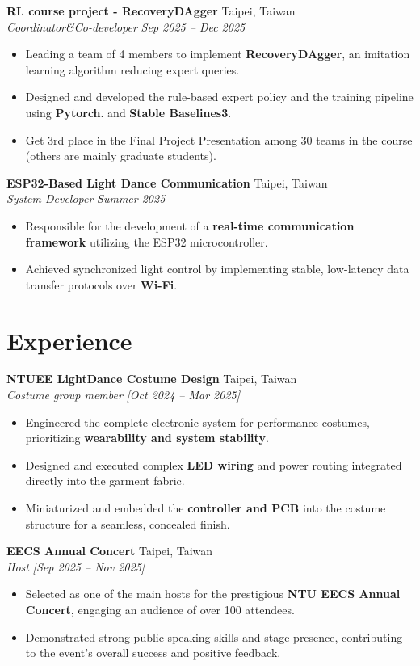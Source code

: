 \documentclass[10pt,a4paper]{article}
\newcommand{\resumeSubheading}[4]{
  \textbf{#1} \hfill #2 \\
  \textit{#3} \hfill \textit{#4}
}
\newcommand{\resumeItem}[1]{
  \item #1
}
\begin{document}
\resumeSubheading{RL course project - RecoveryDAgger}{Taipei, Taiwan}{Coordinator\&Co-developer}{Sep 2025 -- Dec 2025}
\begin{itemize}
  \resumeItem{Leading a team of 4 members to implement \textbf{RecoveryDAgger}, an imitation learning algorithm reducing expert queries.}
  \resumeItem{Designed and developed the rule-based expert policy and the training pipeline using \textbf{Pytorch}. and \textbf{Stable Baselines3}.}
  \resumeItem{Get 3rd place in the Final Project Presentation among 30 teams in the course (others are mainly graduate students).}
\end{itemize}
\resumeSubheading
  {ESP32-Based Light Dance Communication}{Taipei, Taiwan}
  {System Developer}{Summer 2025}
\begin{itemize}
  \resumeItem{Responsible for the development of a \textbf{real-time communication framework} utilizing the ESP32 microcontroller.}
  \resumeItem{Achieved synchronized light control by implementing stable, low-latency data transfer protocols over \textbf{Wi-Fi}.}
\end{itemize}

\section*{Experience}

\resumeSubheading
  {NTUEE LightDance Costume Design}{Taipei, Taiwan}
  {Costume group member}{[Oct 2024 -- Mar 2025]}
\begin{itemize}
  \resumeItem{Engineered the complete electronic system for performance costumes, prioritizing \textbf{wearability and system stability}.}
  \resumeItem{Designed and executed complex \textbf{LED wiring} and power routing integrated directly into the garment fabric.}
  \resumeItem{Miniaturized and embedded the \textbf{controller and PCB} into the costume structure for a seamless, concealed finish.}
\end{itemize}

\resumeSubheading{EECS Annual Concert}{Taipei, Taiwan}{Host}{[Sep 2025 -- Nov 2025]}
\begin{itemize}
  \resumeItem{Selected as one of the main hosts for the prestigious \textbf{NTU EECS Annual Concert}, engaging an audience of over 100 attendees.}
  \resumeItem{Demonstrated strong public speaking skills and stage presence, contributing to the event's overall success and positive feedback.}
\end{itemize}
\end{document}
